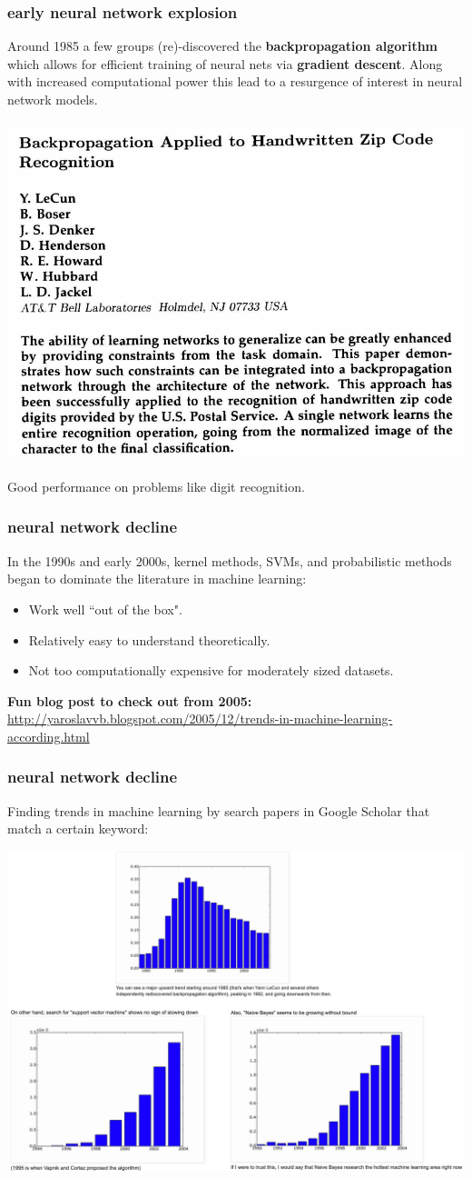 \documentclass[handout,compress]{beamer}
\begin{document}
\begin{frame}
	\frametitle{early neural network explosion}
	Around 1985 a few groups (re)-discovered the \textbf{backpropagation algorithm} which allows for efficient training of neural nets via \textbf{gradient descent}. Along with increased computational power this lead to a resurgence of interest in neural network models. 
	\begin{center}		
		\includegraphics[width=.5\textwidth]{mnistbackprop.png}
	\end{center}
Good performance on problems like digit recognition.
\end{frame}

\begin{frame}
	\frametitle{neural network decline}
	In the 1990s and early 2000s, kernel methods, SVMs, and probabilistic methods began to dominate the literature in machine learning:
	\begin{itemize}
		\item Work well ``out of the box".
		\item Relatively easy to understand theoretically.
		\item Not too computationally expensive for moderately sized datasets. 
	\end{itemize}
\textbf{Fun blog post to check out from 2005:} \url{http://yaroslavvb.blogspot.com/2005/12/trends-in-machine-learning-according.html}
\end{frame}

\begin{frame}
	\frametitle{neural network decline}
		\footnotesize
	Finding trends in machine learning by search papers in Google Scholar that match a certain keyword:
	\begin{center}		
		\includegraphics[width=.9\textwidth]{trends.png}
	\end{center}
\end{frame}
\end{document}
